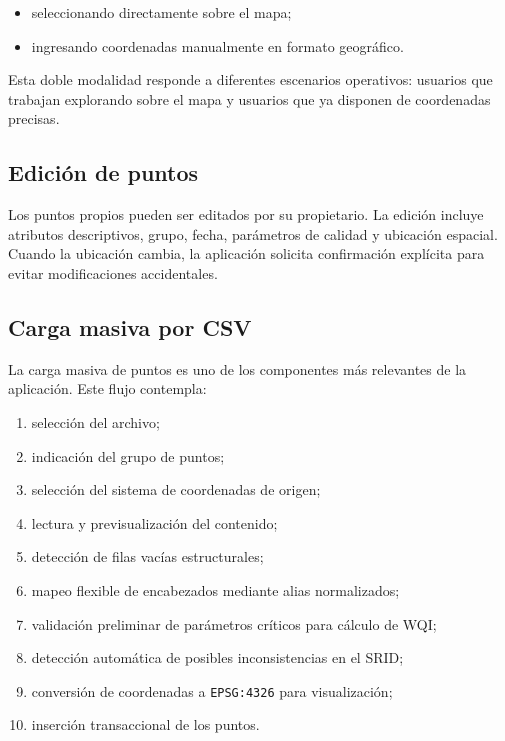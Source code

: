 \documentclass[12pt,a4paper]{report}
\begin{document}
\begin{itemize}
    \item seleccionando directamente sobre el mapa;
    \item ingresando coordenadas manualmente en formato geogr\'afico.
\end{itemize}

Esta doble modalidad responde a diferentes escenarios operativos: usuarios que trabajan explorando sobre el mapa y usuarios que ya disponen de coordenadas precisas.

\subsection{Edici\'on de puntos}

Los puntos propios pueden ser editados por su propietario. La edici\'on incluye atributos descriptivos, grupo, fecha, par\'ametros de calidad y ubicaci\'on espacial. Cuando la ubicaci\'on cambia, la aplicaci\'on solicita confirmaci\'on expl\'icita para evitar modificaciones accidentales.

\subsection{Carga masiva por CSV}

La carga masiva de puntos es uno de los componentes m\'as relevantes de la aplicaci\'on. Este flujo contempla:

\begin{enumerate}
    \item selecci\'on del archivo;
    \item indicaci\'on del grupo de puntos;
    \item selecci\'on del sistema de coordenadas de origen;
    \item lectura y previsualizaci\'on del contenido;
    \item detecci\'on de filas vac\'ias estructurales;
    \item mapeo flexible de encabezados mediante alias normalizados;
    \item validaci\'on preliminar de par\'ametros cr\'iticos para c\'alculo de WQI;
    \item detecci\'on autom\'atica de posibles inconsistencias en el SRID;
    \item conversi\'on de coordenadas a \texttt{EPSG:4326} para visualizaci\'on;
    \item inserci\'on transaccional de los puntos.
\end{enumerate}
\end{document}
